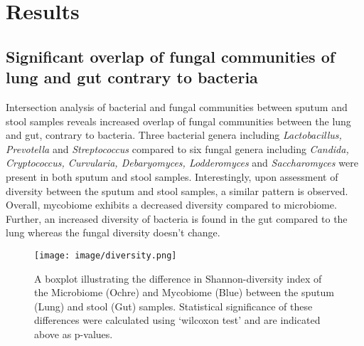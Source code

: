 \section{Results}

\subsection{Significant overlap of fungal communities of lung and gut contrary to bacteria}

Intersection analysis of bacterial and fungal communities between sputum and stool samples reveals increased overlap of fungal communities between the lung and gut, contrary to bacteria. Three bacterial genera including \emph{Lactobacillus, Prevotella} and \emph{Streptococcus} compared to six fungal genera including \emph{Candida, Cryptococcus, Curvularia, Debaryomyces, Lodderomyces} and \emph{Saccharomyces} were present in both sputum and stool samples. Interestingly, upon assessment of diversity between the sputum and stool samples, a similar pattern is observed. Overall, mycobiome exhibits a decreased diversity compared to microbiome. Further, an increased diversity of bacteria is found in the gut compared to the lung whereas the fungal diversity doesn't change. 

\begin{figure}[h]
	\centering
	\texttt{[image: image/diversity.png]}
	\caption{A boxplot illustrating the difference in Shannon-diversity index of the Microbiome (Ochre) and Mycobiome (Blue) between the sputum (Lung) and stool (Gut) samples. Statistical significance of these differences were calculated using `wilcoxon test' and are indicated above as p-values.}
	\label{res2_fig1}
\end{figure}

